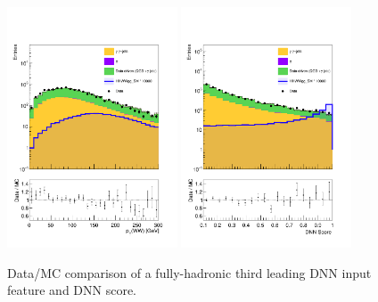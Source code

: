 \begin{figure}[!htbp]
  \centering
  \includegraphics[width=0.45\textwidth]{Sections/HHWWgg/images/FH_DNN/DataMC/DataMC_New_pTBasedSel_WW_pT_SB_log.pdf}%
  \includegraphics[width=0.45\textwidth]{Sections/HHWWgg/images/FH_DNN/DataMC/DataMC_evalDNN_WWvsAll_SB_log.pdf}%
  \caption{Data/MC comparison of a fully-hadronic third leading DNN input feature and DNN score.}
\label{fig:FH_DataMC_2}
\end{figure}




